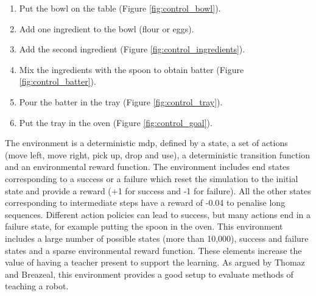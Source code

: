 \begin{enumerate}
	\item Put the bowl on the table (Figure \ref{fig:control_bowl}).
	\item Add one ingredient to the bowl (flour or eggs).
	\item Add the second ingredient (Figure \ref{fig:control_ingredients}).
	\item Mix the ingredients with the spoon to obtain batter (Figure \ref{fig:control_batter}).
	\item Pour the batter in the tray (Figure \ref{fig:control_tray}).
	\item Put the tray in the oven (Figure \ref{fig:control_goal}).
\end{enumerate}

The environment is a deterministic \acrlong{mdp}, defined by a state, a set of actions (move left, move right, pick up, drop and use), a deterministic transition function and an environmental reward function. The environment includes end states corresponding to a success or a failure which reset the simulation to the initial state and provide a reward (+1 for success and -1 for failure). All the other states corresponding to intermediate steps have a reward of -0.04 to penalise long sequences. Different action policies can lead to success, but many actions end in a failure state, for example putting the spoon in the oven. This environment includes a large number of possible states (more than 10,000), success and failure states and a sparse environmental reward function. These elements increase the value of having a teacher present to support the learning. As argued by Thomaz and Breazeal, this environment provides a good setup to evaluate methods of teaching a robot.


